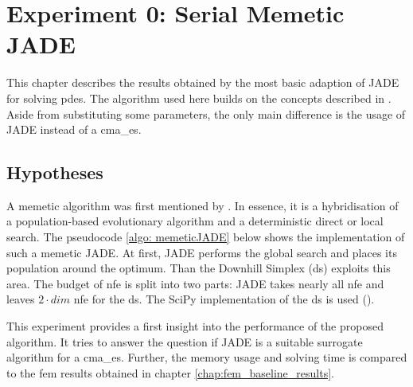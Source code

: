 \documentclass[./\jobname.tex]{subfiles}
\begin{document}
\chapter {Experiment 0: Serial Memetic JADE}
\label{chap:experimet_0}

This chapter describes the results obtained by the most basic adaption of JADE for solving \gls{pde}s. The algorithm used here builds on the concepts described in \cite{chaquet_using_2019}. Aside from substituting some parameters, the only main difference is the usage of JADE instead of a \gls{cma_es}. 

\section{Hypotheses}
A memetic algorithm was first mentioned by \cite{moscato_evolution_2000}. In essence, it is a hybridisation of a population-based evolutionary algorithm and a deterministic direct or local search. The pseudocode \ref{algo: memeticJADE} below shows the implementation of such a memetic JADE. At first, JADE performs the global search and places its population around the optimum. Than the Downhill Simplex (\gls{ds}) exploits this area. The budget of \gls{nfe} is split into two parts: JADE takes nearly all \gls{nfe} and leaves $2\cdot dim$ \gls{nfe} for the \gls{ds}. The SciPy implementation of the \gls{ds} is used (\cite{scipy_scipyoptimizefmin_2020}).

\begin{algorithm}[h]
	\SetAlgoNoLine
	\DontPrintSemicolon
	\label{algo: memeticJADE}
\end{algorithm}

This experiment provides a first insight into the performance of the proposed algorithm. It tries to answer the question if JADE is a suitable surrogate algorithm for a \gls{cma_es}. Further, the memory usage and solving time is compared to the \gls{fem} results obtained in chapter \ref{chap:fem_baseline_results}. 
\end{document}
